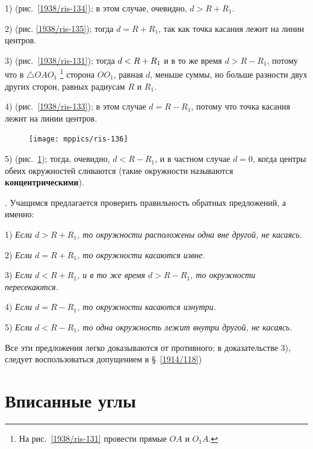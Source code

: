 \documentclass[twoside]{book}
\makeatletter
\newcommand{\rindex}[2][\imki@jobname]{%
  \index[#1]{\detokenize{#2}}%
}
\makeatother
\begin{document}
1)  (рис.~\ref{1938/ris-134});
в этом случае, очевидно, $d>R+R_1$.

2)  (рис. \ref{1938/ris-135});
тогда $d=R+R_1$, так как точка касания лежит на линии центров.

3)  (рис.~\ref{1938/ris-131});
тогда $d\z<R+R_1$ и в то же время $d>R-R_1$, потому что в $\triangle OAO_1$%
\footnote{На рис.~\ref{1938/ris-131} провести прямые $OA$ и $O_1A$.}
сторона $OO_1$, равная $d$, меньше суммы, но больше разности двух других сторон, равных радиусам $R$ и $R_1$.

4)  (рис.~\ref{1938/ris-133});
в этом случае $d=R-R_1$, потому что точка касания лежит на линии центров.

\begin{figure}
\centering
\texttt{[image: mppics/ris-136]}
\caption{}\label{1938/ris-136}
\end{figure}

5)  (рис.~\ref{1938/ris-136});
тогда, очевидно, $d<R-R_1$, и в частном случае $d= 0$, когда центры обеих окружностей сливаются (такие окружности называются \rindex{концентрические окружности}\textbf{концентрическими}).


{\sloppy
\smallskip
\mbox{.}
Учащимся предлагается проверить правильность обратных предложений, а именно:

}

1) \emph{Если $d>R+R_1$, то окружности расположены одна вне другой, не касаясь.}

2) \emph{Если $d=R+R_1$, то окружности касаются извне.}

3) \emph{Если $d<R+R_1$, и в то же время $d>R-R_1$, то окружности пересекаются.} 

4) \emph{Если $d=R-R_1$, то окружности касаются изнутри.}

5) \emph{Если $d<R-R_1$, то одна окружность лежит внутри другой, не касаясь.}

\smallskip
{} Все эти предложения легко доказываются от противного;
в доказательстве 3), следует воспользоваться допущением в §~\ref{1914/118}) %


\section{Вписанные углы}
\end{document}
